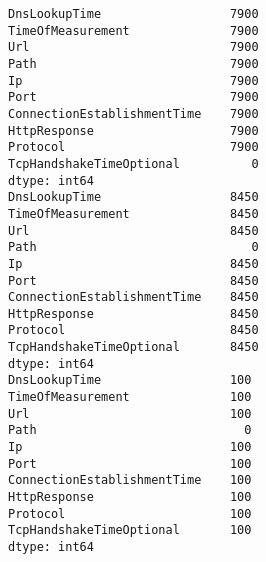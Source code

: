 \documentclass[11pt]{article}
\begin{document}
    \begin{Verbatim}[commandchars=\\\{\}]
DnsLookupTime                  7900
TimeOfMeasurement              7900
Url                            7900
Path                           7900
Ip                             7900
Port                           7900
ConnectionEstablishmentTime    7900
HttpResponse                   7900
Protocol                       7900
TcpHandshakeTimeOptional          0
dtype: int64
DnsLookupTime                  8450
TimeOfMeasurement              8450
Url                            8450
Path                              0
Ip                             8450
Port                           8450
ConnectionEstablishmentTime    8450
HttpResponse                   8450
Protocol                       8450
TcpHandshakeTimeOptional       8450
dtype: int64
DnsLookupTime                  100
TimeOfMeasurement              100
Url                            100
Path                             0
Ip                             100
Port                           100
ConnectionEstablishmentTime    100
HttpResponse                   100
Protocol                       100
TcpHandshakeTimeOptional       100
dtype: int64

    \end{Verbatim}

    \begin{center}
    \end{center}
    { \hspace*{\fill} \\}
    
\end{document}
